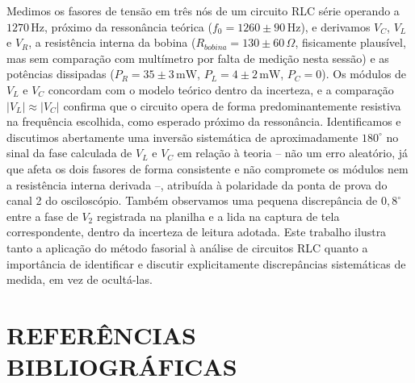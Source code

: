 \documentclass[12pt]{article}
\begin{document}
Medimos os fasores de tensão em três nós de um circuito RLC série operando a $1270\,\text{Hz}$, próximo da ressonância teórica ($f_0=1260\pm90\,\text{Hz}$), e derivamos $V_C$, $V_L$ e $V_R$, a resistência interna da bobina ($R_{bobina}=130\pm60\,\Omega$, fisicamente plausível, mas sem comparação com multímetro por falta de medição nesta sessão) e as potências dissipadas ($P_R=35\pm3\,\text{mW}$, $P_L=4\pm2\,\text{mW}$, $P_C=0$). Os módulos de $V_L$ e $V_C$ concordam com o modelo teórico dentro da incerteza, e a comparação $|V_L|\approx|V_C|$ confirma que o circuito opera de forma predominantemente resistiva na frequência escolhida, como esperado próximo da ressonância. Identificamos e discutimos abertamente uma inversão sistemática de aproximadamente $180^\circ$ no sinal da fase calculada de $V_L$ e $V_C$ em relação à teoria -- não um erro aleatório, já que afeta os dois fasores de forma consistente e não compromete os módulos nem a resistência interna derivada --, atribuída à polaridade da ponta de prova do canal 2 do osciloscópio. Também observamos uma pequena discrepância de $0{,}8^\circ$ entre a fase de $V_2$ registrada na planilha e a lida na captura de tela correspondente, dentro da incerteza de leitura adotada. Este trabalho ilustra tanto a aplicação do método fasorial à análise de circuitos RLC quanto a importância de identificar e discutir explicitamente discrepâncias sistemáticas de medida, em vez de ocultá-las.

\section{REFERÊNCIAS BIBLIOGRÁFICAS}
\renewcommand{\refname}{}


\end{document}
